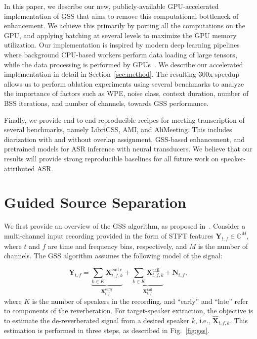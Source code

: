 \documentclass[a4paper]{article}
\begin{document}
In this paper, we describe our new, publicly-available GPU-accelerated implementation of GSS that aims to remove this computational bottleneck of enhancement. We achieve this primarily by porting all the computations on the GPU, and applying batching at several levels to maximize the GPU memory utilization. Our implementation is inspired by modern deep learning pipelines where background CPU-based workers perform data loading of large tensors, while the data processing is performed by GPUs~\cite{Paszke2019PyTorchAI}. We describe our accelerated implementation in detail in Section~\ref{sec:method}. The resulting 300x speedup allows us to perform ablation experiments using several benchmarks to analyze the importance of factors such as WPE, noise class, context duration, number of BSS iterations, and number of channels, towards GSS performance.

Finally, we provide end-to-end reproducible recipes for meeting transcription of several benchmarks, namely LibriCSS, AMI, and AliMeeting. This includes diarization with and without overlap assignment, GSS-based enhancement, and pretrained models for ASR inference with neural transducers. We believe that our results will provide strong reproducible baselines for all future work on speaker-attributed ASR.

\section{Guided Source Separation}
\label{sec:gss}

We first provide an overview of the GSS algorithm, as proposed in~\cite{Boeddeker2018FrontendPF}. Consider a multi-channel input recording provided in the form of STFT features $\mathbf{Y}_{t,f}\in \mathbb{C}^M$, where $t$ and $f$ are time and frequency bins, respectively, and $M$ is the number of channels. The GSS algorithm assumes the following model of the signal:

\begin{equation}
    \mathbf{Y}_{t,f} = \underbrace{\sum_{k\in K} \mathbf{X}_{t,f,k}^{\mathrm{early}}}_{\mathbf{X}_{t,f}^{\mathrm{early}}} + \underbrace{\sum_{k\in K} \mathbf{X}_{t,f,k}^{\mathrm{tail}}}_{\mathbf{X}_{t,f}^{\mathrm{tail}}} + \mathbf{N}_{t,f},
\end{equation}
where $K$ is the number of speakers in the recording, and ``early'' and ``late'' refer to components of the reverberation. For target-speaker extraction, the objective is to estimate the de-reverberated signal from a desired speaker $k$, i.e., $\widehat{\mathbf{X}}_{t,f,k}$. This estimation is performed in three steps, as described in Fig.~\ref{fig:gss}.
\end{document}
